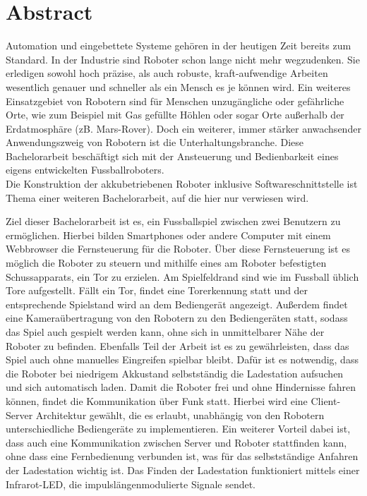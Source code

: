 \chapter*{Abstract}
Automation und eingebettete Systeme gehören in der heutigen Zeit bereits zum Standard. In der Industrie sind Roboter schon lange nicht mehr wegzudenken. Sie erledigen sowohl hoch präzise, als auch robuste, kraft-aufwendige Arbeiten wesentlich genauer und schneller als ein Mensch es je können wird. Ein weiteres Einsatzgebiet von Robotern sind für Menschen unzugängliche oder gefährliche Orte, wie zum Beispiel mit Gas gefüllte Höhlen oder sogar Orte außerhalb der Erdatmosphäre (zB. Mars-Rover). Doch ein weiterer, immer stärker anwachsender Anwendungszweig von Robotern ist die Unterhaltungsbranche. Diese Bachelorarbeit beschäftigt sich mit der Ansteuerung und Bedienbarkeit eines eigens entwickelten Fussballroboters. \\
Die Konstruktion der akkubetriebenen Roboter inklusive Softwareschnittstelle ist Thema einer weiteren Bachelorarbeit, auf die hier nur verwiesen wird.

Ziel dieser Bachelorarbeit ist es, ein Fussballspiel zwischen zwei Benutzern zu ermöglichen. Hierbei bilden Smartphones oder andere Computer mit einem Webbrowser die Fernsteuerung für die Roboter. Über diese Fernsteuerung ist es möglich die Roboter zu steuern und mithilfe eines am Roboter befestigten Schussapparats, ein Tor zu erzielen. Am Spielfeldrand sind wie im Fussball üblich Tore aufgestellt. Fällt ein Tor, findet eine Torerkennung statt und der entsprechende Spielstand wird an dem Bediengerät angezeigt. Außerdem findet eine Kameraübertragung von den Robotern zu den Bediengeräten statt, sodass das Spiel auch gespielt werden kann, ohne sich in unmittelbarer Nähe der Roboter zu befinden. Ebenfalls Teil der Arbeit ist es zu gewährleisten, dass das Spiel auch ohne manuelles Eingreifen spielbar bleibt. Dafür ist es notwendig, dass die Roboter bei niedrigem Akkustand selbstständig die Ladestation aufsuchen und sich automatisch laden. 
Damit die Roboter frei und ohne Hindernisse fahren können, findet die Kommunikation über Funk statt. Hierbei wird eine Client-Server Architektur gewählt, die es erlaubt, unabhängig von den Robotern unterschiedliche Bediengeräte zu implementieren. Ein weiterer Vorteil dabei ist, dass auch eine Kommunikation zwischen Server und Roboter stattfinden kann, ohne dass eine Fernbedienung verbunden ist, was für das selbstständige Anfahren der Ladestation wichtig ist. Das Finden der Ladestation funktioniert mittels einer Infrarot-LED, die impulslängenmodulierte Signale sendet.